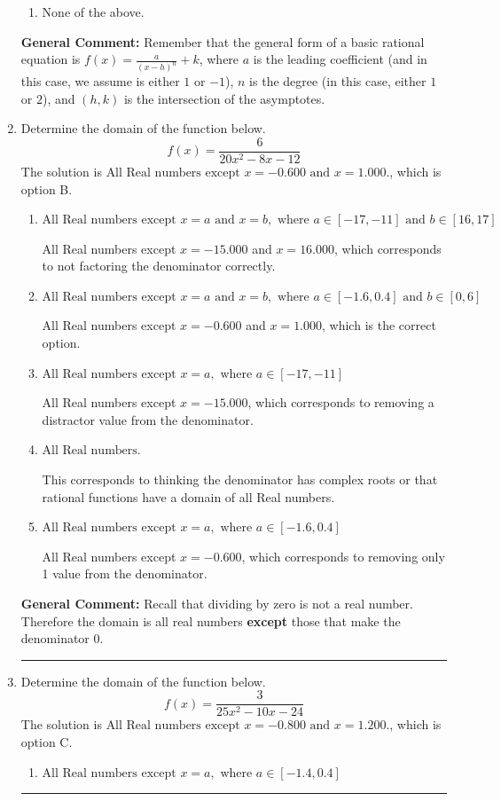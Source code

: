 \documentclass{extbook}[14pt]
\newcommand{\litem}[1]{\item #1

\rule{\textwidth}{0.4pt}}
\begin{document}
\begin{enumerate}
{\begin{enumerate}[label=\Alph*.]
\begin{multicols}{2}
\end{multicols}\item None of the above.\end{enumerate}
\textbf{General Comment:} Remember that the general form of a basic rational equation is $ f(x) = \frac{a}{(x-h)^n} + k$, where $a$ is the leading coefficient (and in this case, we assume is either $1$ or $-1$), $n$ is the degree (in this case, either $1$ or $2$), and $(h, k)$ is the intersection of the asymptotes.
}
\litem{
Determine the domain of the function below.
\[ f(x) = \frac{6}{20x^{2} -8 x -12} \]The solution is \( \text{All Real numbers except } x = -0.600 \text{ and } x = 1.000. \), which is option B.\begin{enumerate}[label=\Alph*.]
\item \( \text{All Real numbers except } x = a \text{ and } x = b, \text{ where } a \in [-17, -11] \text{ and } b \in [16, 17] \)

All Real numbers except $x = -15.000$ and $x = 16.000$, which corresponds to not factoring the denominator correctly.
\item \( \text{All Real numbers except } x = a \text{ and } x = b, \text{ where } a \in [-1.6, 0.4] \text{ and } b \in [0, 6] \)

All Real numbers except $x = -0.600$ and $x = 1.000$, which is the correct option.
\item \( \text{All Real numbers except } x = a, \text{ where } a \in [-17, -11] \)

All Real numbers except $x = -15.000$, which corresponds to removing a distractor value from the denominator.
\item \( \text{All Real numbers.} \)

This corresponds to thinking the denominator has complex roots or that rational functions have a domain of all Real numbers.
\item \( \text{All Real numbers except } x = a, \text{ where } a \in [-1.6, 0.4] \)

All Real numbers except $x = -0.600$, which corresponds to removing only 1 value from the denominator.
\end{enumerate}

\textbf{General Comment:} Recall that dividing by zero is not a real number. Therefore the domain is all real numbers \textbf{except} those that make the denominator 0.
}
\litem{
Determine the domain of the function below.
\[ f(x) = \frac{3}{25x^{2} -10 x -24} \]The solution is \( \text{All Real numbers except } x = -0.800 \text{ and } x = 1.200. \), which is option C.\begin{enumerate}[label=\Alph*.]
\item \( \text{All Real numbers except } x = a, \text{ where } a \in [-1.4, 0.4] \)


\end{enumerate}}
\end{enumerate}
\end{document}
